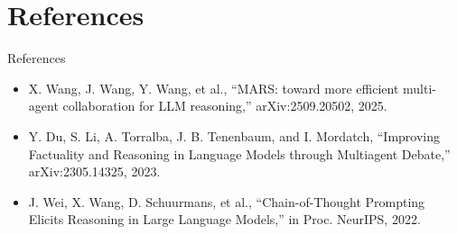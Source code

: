\documentclass{beamer}
\begin{document}
\section{References}
\begin{frame}{References}
\footnotesize
\begin{itemize}
\item X. Wang, J. Wang, Y. Wang, et al., ``MARS: toward more efficient multi-agent collaboration for LLM reasoning,'' arXiv:2509.20502, 2025.
\item Y. Du, S. Li, A. Torralba, J. B. Tenenbaum, and I. Mordatch, ``Improving Factuality and Reasoning in Language Models through Multiagent Debate,'' arXiv:2305.14325, 2023.
\item J. Wei, X. Wang, D. Schuurmans, et al., ``Chain-of-Thought Prompting Elicits Reasoning in Large Language Models,'' in Proc. NeurIPS, 2022.
\end{itemize}
\end{frame}
\begin{frame}\vfill{}\vfill\end{frame}
\end{document}
